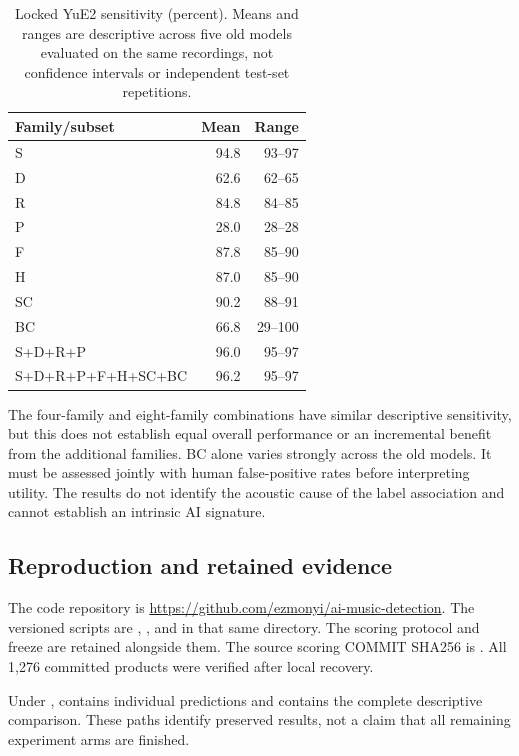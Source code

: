 \begin{table}[htbp]
\centering
\caption{Locked YuE2 sensitivity (percent). Means and ranges are descriptive
across five old models evaluated on the same recordings, not confidence
intervals or independent test-set repetitions.}
\label{tab:yue2locked}
\begin{tabular}{lrr}
\toprule
Family/subset & Mean & Range \\
\midrule
S & 94.8 & 93--97 \\
D & 62.6 & 62--65 \\
R & 84.8 & 84--85 \\
P & 28.0 & 28--28 \\
F & 87.8 & 85--90 \\
H & 87.0 & 85--90 \\
SC & 90.2 & 88--91 \\
BC & 66.8 & 29--100 \\
S+D+R+P & 96.0 & 95--97 \\
S+D+R+P+F+H+SC+BC & 96.2 & 95--97 \\
\bottomrule
\end{tabular}
\end{table}

The four-family and eight-family combinations have similar descriptive
sensitivity, but this does not establish equal overall performance or an
incremental benefit from the additional families. BC alone varies strongly
across the old models. It must be assessed jointly with human false-positive
rates before interpreting utility. The results do not identify the acoustic
cause of the label association and cannot establish an intrinsic AI signature.

\subsection{Reproduction and retained evidence}
The code repository is
\url{https://github.com/ezmonyi/ai-music-detection}.
The versioned scripts are
,
, and  in that
same directory. The scoring protocol and freeze are retained alongside them.
The source scoring COMMIT SHA256 is
.
All 1,276 committed products were verified after local recovery.

Under ,
 contains individual predictions
and 
contains the complete descriptive comparison. These paths identify preserved
results, not a claim that all remaining experiment arms are finished.
